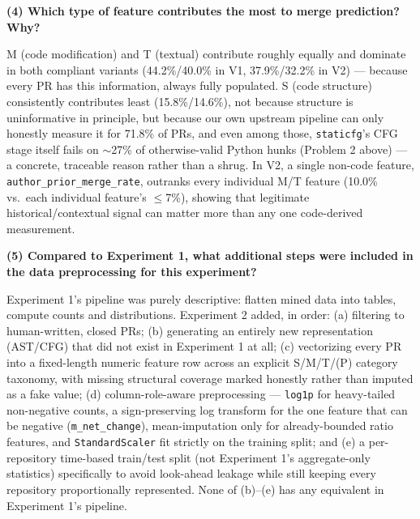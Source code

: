 \documentclass{experimentreport}
\begin{document}
{\textbf{(4) Which type of feature contributes the most to merge prediction? Why?}

M (code modification) and T (textual) contribute roughly equally and dominate in both compliant
variants (44.2\%/40.0\% in V1, 37.9\%/32.2\% in V2) --- because every PR has this information,
always fully populated. S (code structure) consistently contributes least (15.8\%/14.6\%), not
because structure is uninformative in principle, but because our own upstream pipeline can only
honestly measure it for 71.8\% of PRs, and even among those, \texttt{staticfg}'s CFG stage itself
fails on $\sim$27\% of otherwise-valid Python hunks (Problem 2 above) --- a concrete, traceable
reason rather than a shrug. In V2, a single non-code feature,
\texttt{author\_prior\_merge\_rate}, outranks every individual M/T feature (10.0\% vs.\ each
individual feature's $\leq$7\%), showing that legitimate historical/contextual signal can matter
more than any one code-derived measurement.

\textbf{(5) Compared to Experiment 1, what additional steps were included in the data
preprocessing for this experiment?}

Experiment 1's pipeline was purely descriptive: flatten mined data into tables, compute counts and
distributions. Experiment 2 added, in order: (a) filtering to human-written, closed PRs; (b)
generating an entirely new representation (AST/CFG) that did not exist in Experiment 1 at all; (c)
vectorizing every PR into a fixed-length numeric feature row across an explicit S/M/T/(P) category
taxonomy, with missing structural coverage marked honestly rather than imputed as a fake value; (d)
column-role-aware preprocessing --- \texttt{log1p} for heavy-tailed non-negative counts, a
sign-preserving log transform for the one feature that can be negative
(\texttt{m\_net\_change}), mean-imputation only for already-bounded ratio features, and
\texttt{StandardScaler} fit strictly on the training split; and (e) a per-repository time-based
train/test split (not Experiment 1's aggregate-only statistics) specifically to avoid look-ahead
leakage while still keeping every repository proportionally represented. None of (b)--(e) has any
equivalent in Experiment 1's pipeline.

}


\teachercomment
\end{document}
